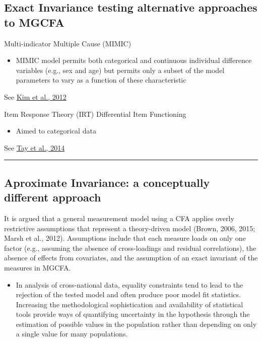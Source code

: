 \documentclass[
]{book}
\providecommand{\tightlist}{%
  \setlength{\itemsep}{0pt}\setlength{\parskip}{0pt}}
\begin{document}
\hypertarget{exact-invariance-testing-alternative-approaches-to-mgcfa}{%
\subsection{Exact Invariance testing alternative approaches to MGCFA}\label{exact-invariance-testing-alternative-approaches-to-mgcfa}}

Multi-indicator Multiple Cause (MIMIC)

\begin{itemize}
\tightlist
\item
  MIMIC model permits both categorical and continuous individual difference variables (e.g., sex and age) but permits only a subset of the model parameters to vary as a function of these characteristic
\end{itemize}

See \href{https://journals.sagepub.com/doi/abs/10.1177/0013164411427395?journalCode=epma}{Kim et al., 2012}

Item Response Theory (IRT) Differential Item Functioning

\begin{itemize}
\tightlist
\item
  Aimed to categorical data
\end{itemize}

See \href{https://journals.sagepub.com/doi/10.1177/1094428114553062}{Tay et al., 2014}

\begin{center}\rule{0.5\linewidth}{0.5pt}\end{center}

\hypertarget{aproximate-invariance-a-conceptually-different-approach}{%
\subsection{Aproximate Invariance: a conceptually different approach}\label{aproximate-invariance-a-conceptually-different-approach}}

It is argued that a general measurement model using a CFA applies overly restrictive assumptions
that represent a theory-driven model (Brown, 2006, 2015; Marsh et al., 2012). Assumptions include that each measure loads on only one factor (e.g., assuming the absence of cross-loadings and residual correlations), the absence of effects from covariates, and the assumption of an exact invariant of the measures in MGCFA.

\begin{itemize}
\tightlist
\item
  In analysis of cross-national data, equality constraints tend to lead to the rejection of the tested model and often produce poor model fit statistics. Increasing the methodological sophistication and availability of statistical tools provide ways of quantifying uncertainty in the hypothesis through the estimation of possible values in the population rather than depending on only a single value for many populations.
\end{itemize}
\end{document}
